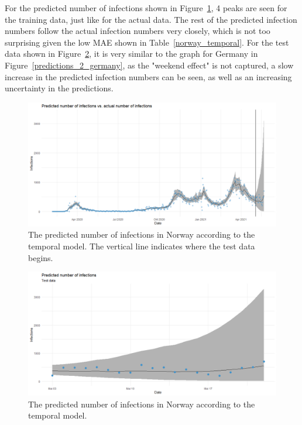 For the predicted number of infections shown in Figure~\ref{predictions_1_norway}, 4 peaks are seen for the training data, just like for the actual data. The rest of the predicted infection numbers follow the actual infection numbers very closely, which is not too surprising given the low MAE shown in Table~\ref{norway_temporal}. For the test data shown in Figure~\ref{predictions_2_norway}, it is very similar to the graph for Germany in Figure~\ref{predictions_2_germany}, as the "weekend effect" is not captured, a slow increase in the predicted infection numbers can be seen, as well as an increasing uncertainty in the predictions.
\begin{figure}[H]
  \centering
  \includegraphics[width = \textwidth]{predictions_1_norway.png}
  \caption{The predicted number of infections in Norway according to the temporal model. The vertical line indicates where the test data begins.}
  \label{predictions_1_norway}
\end{figure}
\begin{figure}[H]
  \centering
  \includegraphics[width = \textwidth]{predictions_2_norway.png}
  \caption{The predicted number of infections in Norway according to the temporal model.}
  \label{predictions_2_norway}
\end{figure}
